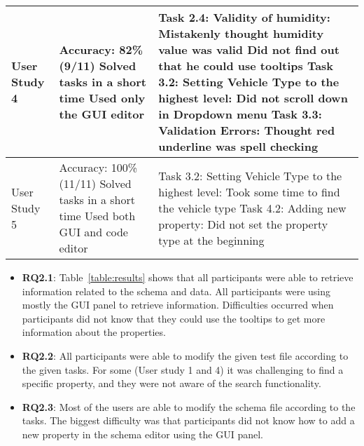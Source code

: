 \begin{table*}[!htbp]
\begin{tabular}{lp{4.5cm}p{6cm}}
        User Study 4 &
        Accuracy: 82\%(9/11)\newline
        Solved tasks in a short time\newline
        Used only the GUI editor

        &

        Task 2.4: Validity of humidity:\newline
        Mistakenly thought humidity value was valid\newline
        Did not find out that he could use tooltips\newline
        Task 3.2: Setting Vehicle Type to the highest level: \newline
        Did not scroll down in Dropdown menu\newline
        Task 3.3: Validation Errors:\newline
        Thought red underline was spell checking \\ \midrule

        User Study 5 &
        Accuracy: 100\%(11/11)\newline
        Solved tasks in a short time\newline
        Used both GUI and code editor

        &

        Task 3.2: Setting Vehicle Type to the highest level: \newline
        Took some time to find the vehicle type \newline
        Task 4.2: Adding new property:\newline
        Did not set the property type at the beginning \\ \bottomrule
    \end{tabular}
\end{table*}
\begin{itemize}
    \item \textbf{RQ2.1}: Table~\ref{table:results} shows that all
    participants were able to retrieve information related to the schema and data.
    All participants were using mostly the GUI panel to retrieve information.
    Difficulties occurred when participants did not know that they could use the tooltips to get more information about the properties.
    \item \textbf{RQ2.2}: All participants were able to modify the given test file according to the given tasks.
    For some (User study 1 and 4) it was challenging to find a specific property, and they were not aware of the search functionality.
    \item \textbf{RQ2.3}: Most of the users are able to modify the schema file according to the tasks.
    The biggest difficulty was that participants did not know how to add a new property in the schema editor using the GUI panel.
\end{itemize}

